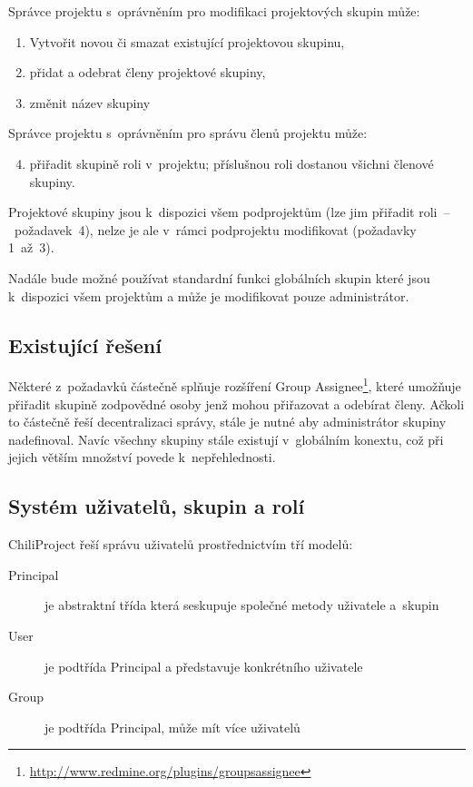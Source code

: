 \documentclass[thesis=B,czech]{FITthesis}[2012/05/02]
\begin{document}
Správce projektu s~oprávněním pro modifikaci projektových skupin může:

\begin{enumerate}[1.]
\item
  Vytvořit novou či smazat existující projektovou skupinu,
\item
  přidat a odebrat členy projektové skupiny,
\item
  změnit název skupiny
\end{enumerate}
Správce projektu s~oprávněním pro správu členů projektu může:

\begin{enumerate}[1.]
\setcounter{enumi}{3}
\item
  přiřadit skupině roli v~projektu; příslušnou roli dostanou všichni
  členové skupiny.
\end{enumerate}
Projektové skupiny jsou k~dispozici všem podprojektům (lze jim přiřadit
roli~--~požadavek~4), nelze je ale v~rámci podprojektu modifikovat
(požadavky 1~až~3).

Nadále bude možné používat standardní funkci globálních skupin které
jsou k~dispozici všem projektům a může je modifikovat pouze
administrátor.

\subsection{Existující řešení}

Některé z~požadavků částečně splňuje rozšíření Group Assignee\footnote{\url{http://www.redmine.org/plugins/groupsassignee}},
které umožňuje přiřadit skupině zodpovědné osoby jenž mohou přiřazovat a
odebírat členy. Ačkoli to částečně řeší decentralizaci správy, stále je
nutné aby administrátor skupiny nadefinoval. Navíc všechny skupiny stále
existují v~globálním konextu, což při jejich větším množství povede
k~nepřehlednosti.

\subsection{Systém uživatelů, skupin a rolí}

\label{sec:proj_group_sys}

ChiliProject řeší správu uživatelů prostřednictvím tří modelů:

\begin{description}
\item[Principal] je abstraktní třída která seskupuje společné metody
  uživatele \mbox{a~skupin}
\item[User] je podtřída Principal a představuje konkrétního
  uživatele
\item[Group] je podtřída Principal, může mít více uživatelů
\end{description}
\end{document}
